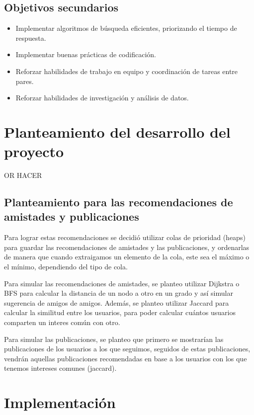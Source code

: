 \documentclass[9pt,letterpaper,onecolumn]{rho-class/rho}
\begin{document}
    \subsection{Objetivos secundarios}
    \begin{itemize}
        \item Implementar algoritmos de búsqueda eficientes, priorizando el tiempo de respuesta.
        \item Implementar buenas prácticas de codificación.
        \item Reforzar habilidades de trabajo en equipo y coordinación de tareas entre pares.
        \item Reforzar habilidades de investigación y análisis de datos.
    \end{itemize}

\newpage
\section{Planteamiento del desarrollo del proyecto}

    OR HACER

    \subsection{Planteamiento para las recomendaciones de amistades y publicaciones}

    Para lograr estas recomendaciones se decidió utilizar colas de prioridad (heaps) para guardar las recomendaciones de amistades y las publicaciones, y ordenarlas de manera que cuando extraigamos un elemento de la cola, este sea el máximo o el mínimo, dependiendo del tipo de cola.
    
    Para simular las recomendaciones de amistades, se planteo utilizar Dijkstra o BFS para calcular la distancia de un nodo a otro en un grado y así simular sugerencia de amigos de amigos. Además, se planteo utilizar Jaccard para calcular la similitud entre los usuarios, para poder calcular cuántos usuarios comparten un interes común con otro.

    Para simular las publicaciones, se planteo que primero se mostrarían las publicaciones de los usuarios a los que seguimos, seguidos de estas publicaciones, vendrán aquellas publicaciones recomendadas en base a los usuarios con los que tenemos intereses comunes (jaccard).

\newpage
\section{Implementación}
\end{document}
